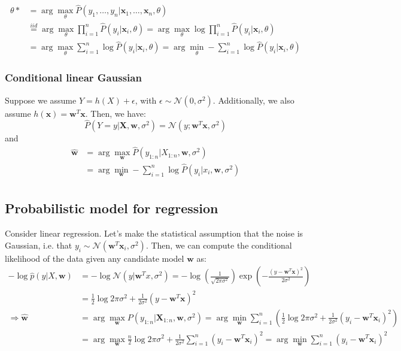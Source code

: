 \documentclass[a4paper,10pt,twoside]{article}
\begin{document}
\begin{align*}
    \theta*&=\arg\max_{\theta}\hat{P}(y_1,\ldots, y_n|\mathbf{x}_1,\ldots, \mathbf{x}_n, \theta)\\
    &\overset{iid}{=}\arg\max_{\theta}\prod_{i=1}^n\hat{P}(y_i|\mathbf{x}_i,\theta)=\arg\max_{\theta}\log\prod_{i=1}^n\hat{P}(y_i|\mathbf{x}_i,\theta)\\
    &=\arg\max_{\theta}\sum_{i=1}^{n}\log\hat{P}(y_i|\mathbf{x}_i,\theta)=\arg\min_{\theta}-\sum_{i=1}^{n}\log\hat{P}(y_i|\mathbf{x}_i,\theta)
\end{align*}

\subsubsection{Conditional linear Gaussian}

Suppose we assume $Y=h(X)+\epsilon$, with $\epsilon\sim\mathcal{N}(0,\sigma^2)$. Additionally, we also assume $h(\mathbf{x})=\mathbf{w}^T\mathbf{x}$. Then, we have:
\begin{equation*}
    \hat{P}(Y=y|\mathbf{X},\mathbf{w},\sigma^2)=\mathcal{N}(y;\mathbf{w}^T\mathbf{x},\sigma^2)
\end{equation*}
and
\begin{align*}
    \hat{\mathbf{w}}&=\arg\max_{\mathbf{w}}\hat{P}(y_{1:n}|X_{1:n},\mathbf{w},\sigma^2)\\
    &=\arg\min_{\mathbf{w}}-\sum_{i=1}^{n}\log\hat{P}(y_i|x_i,\mathbf{w},\sigma^2)\\
\end{align*}

\subsection{Probabilistic model for regression}

Consider linear regression. Let's make the statistical assumption that the noise is Gaussian, i.e. that $y_i\sim\mathcal{N}(\mathbf{w}^T\mathbf{x}_i,\sigma^2)$. Then, we can compute the conditional likelihood of the data given any candidate model $\mathbf{w}$ as:
\begin{align*}
    -\log\hat{p}(y|X,\mathbf{w})&=-\log\mathcal{N}(y|\mathbf{w}^Tx,\sigma^2)=-\log(\frac{1}{\sqrt{2\pi\sigma^2}})\exp(-\frac{(y-\mathbf{w}^T\mathbf{x})^2}{2\sigma^2})\\
    &=\frac{1}{2}\log 2\pi\sigma^2+\frac{1}{2\sigma^2}(y-\mathbf{w}^T\mathbf{x})^2\\
    \Rightarrow\hat{\mathbf{w}}&=\arg\max_{\mathbf{w}}P(y_{1:n}|\mathbf{X}_{1:n},\mathbf{w},\sigma^2)=\arg\min_{\mathbf{w}}\sum_{i=1}^{n}(\frac{1}{2}\log2\pi\sigma^2+\frac{1}{2\sigma^2}(y_i-\mathbf{w}^T\mathbf{x}_i)^2)\\
    &=\arg\max_{\mathbf{w}}\frac{n}{2}\log 2\pi\sigma^2+\frac{1}{2\sigma^2}\sum_{i=1}^{n}(y_i-\mathbf{w}^T\mathbf{x}_i)^2=\arg\min_{\mathbf{w}}\sum_{i=1}^{n}(y_i-\mathbf{w}^T\mathbf{x}_i)^2
\end{align*}
\end{document}
